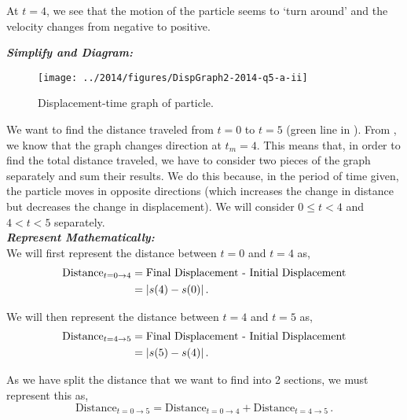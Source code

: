 \begin{subquestions}
\begin{subsubquestions}
At $t=4$, we see that the motion of the particle seems to `turn around' and the velocity changes from negative to positive. \\


\subsubquestion

\begin{subsubsubquestions}
	
\subsubsubquestion

\textbf{\textit{Simplify and Diagram:}} \\

\begin{figure}[H]
	\begin{center}
		\texttt{[image: ../2014/figures/DispGraph2-2014-q5-a-ii]}
		\caption{\label{2014:q5:SGraph2} Displacement-time graph of particle.}
	\end{center}
\end{figure}

We want to find the distance traveled from $t=0$ to $t=5$ (green line in ). From , we know that the graph changes direction at $t_m=4$. This means that, in order to find the total distance traveled, we have to consider two pieces of the graph separately and sum their results. We do this because, in the period of time given, the particle moves in opposite directions (which increases the change in distance but decreases the change in displacement). We will consider $0 \leq t < 4$ and $4 < t < 5$ separately.\\

\textbf{\textit{Represent Mathematically:}} \\
We will first represent the distance between $t=0$ and $t=4$ as,
\begin{align}
	\text{Distance}_{t=0 \rightarrow 4} & = \text{Final Displacement - Initial Displacement} \nonumber \\
							& = |s(4)-s(0)| \,.  \label{2014:q5:Seqn1}
\end{align}

We will then represent the distance between $t=4$ and $t=5$ as,
\begin{align}
	\text{Distance}_{t=4 \rightarrow 5} & = \text{Final Displacement - Initial Displacement} \nonumber \\
	& = |s(5)-s(4)| \,.  \label{2014:q5:Seqn2}
\end{align}

As we have split the distance that we want to find into 2 sections, we must represent this as,
\begin{equation}
	\text{Distance}_{t=0 \rightarrow 5} = \text{Distance}_{t=0 \rightarrow 4} + \text{Distance}_{t=4 \rightarrow 5} \,. \label{2014:q5:Seqn3}
\end{equation}


\end{subsubsubquestions}
\end{subsubquestions}
\end{subquestions}
